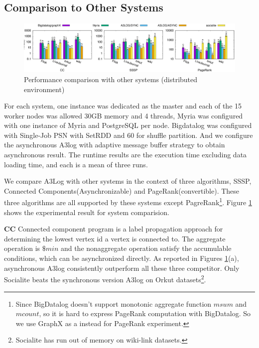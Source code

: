 \subsection{Comparison to Other Systems}

\begin{figure}[!t]
	\vspace{-0.1in}
	\hspace{-0.28in}
	\includegraphics[width=7.2in]{figuration/compare.eps}
	\vspace{-0.1in}
	\caption{Performance comparison with other systems (distributed environment)}
	\label{fig:dist-result}
\end{figure}


For each system, one instance was dedicated as the master and each of the 15 worker nodes was allowed 30GB memory and 4 threads, Myria was configured with one instance of Myria and PostgreSQL per node. Bigdatalog was configured with Single-Job PSN with SetRDD and 60 for shuffle partition. And we configure the asynchronous A3log with adaptive message buffer strategy to obtain asynchronous result. The runtime results are the execution time excluding data loading time, and each is a mean of three runs.

We compare A3Log with other systems in the context of three algorithms, SSSP, Connected Components(Asynchronizable) and PageRank(convertible). These three algorithms are all supported by these systems except PagreRank\footnote{Since BigDatalog doesn't support monotonic aggregate function $msum$ and $mcount$, so it is hard to express PageRank computation with BigDatalog. So we use GraphX as a instead for PageRank experiment.}. Figure \ref{fig:dist-result} shows the experimental result for system comparision. 

\textbf{CC} Connected component program is a label propagation approach for determining the lowest vertex id a vertex is connected to. The aggregate operation is $\$min$ and the nonaggregate operation satisfy the accumulable conditions, which can be asynchronized directly. As reported in Figures \ref{fig:dist-result}(a), asynchronous A3log consistently outperform all these three competitor. Only Socialite beats the synchronous version A3log on Orkut datasets\footnote{Socialite has run out of memory on wiki-link datasets.}. 

